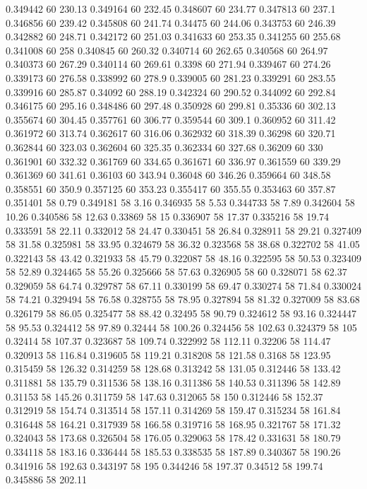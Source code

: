0.349442 60 230.13
0.349164 60 232.45
0.348607 60 234.77
0.347813 60 237.1
0.346856 60 239.42
0.345808 60 241.74
0.34475 60 244.06
0.343753 60 246.39
0.342882 60 248.71
0.342172 60 251.03
0.341633 60 253.35
0.341255 60 255.68
0.341008 60 258
0.340845 60 260.32
0.340714 60 262.65
0.340568 60 264.97
0.340373 60 267.29
0.340114 60 269.61
0.3398 60 271.94
0.339467 60 274.26
0.339173 60 276.58
0.338992 60 278.9
0.339005 60 281.23
0.339291 60 283.55
0.339916 60 285.87
0.34092 60 288.19
0.342324 60 290.52
0.344092 60 292.84
0.346175 60 295.16
0.348486 60 297.48
0.350928 60 299.81
0.35336 60 302.13
0.355674 60 304.45
0.357761 60 306.77
0.359544 60 309.1
0.360952 60 311.42
0.361972 60 313.74
0.362617 60 316.06
0.362932 60 318.39
0.36298 60 320.71
0.362844 60 323.03
0.362604 60 325.35
0.362334 60 327.68
0.36209 60 330
0.361901 60 332.32
0.361769 60 334.65
0.361671 60 336.97
0.361559 60 339.29
0.361369 60 341.61
0.36103 60 343.94
0.36048 60 346.26
0.359664 60 348.58
0.358551 60 350.9
0.357125 60 353.23
0.355417 60 355.55
0.353463 60 357.87
0.351401 58 0.79
0.349181 58 3.16
0.346935 58 5.53
0.344733 58 7.89
0.342604 58 10.26
0.340586 58 12.63
0.33869 58 15
0.336907 58 17.37
0.335216 58 19.74
0.333591 58 22.11
0.332012 58 24.47
0.330451 58 26.84
0.328911 58 29.21
0.327409 58 31.58
0.325981 58 33.95
0.324679 58 36.32
0.323568 58 38.68
0.322702 58 41.05
0.322143 58 43.42
0.321933 58 45.79
0.322087 58 48.16
0.322595 58 50.53
0.323409 58 52.89
0.324465 58 55.26
0.325666 58 57.63
0.326905 58 60
0.328071 58 62.37
0.329059 58 64.74
0.329787 58 67.11
0.330199 58 69.47
0.330274 58 71.84
0.330024 58 74.21
0.329494 58 76.58
0.328755 58 78.95
0.327894 58 81.32
0.327009 58 83.68
0.326179 58 86.05
0.325477 58 88.42
0.32495 58 90.79
0.324612 58 93.16
0.324447 58 95.53
0.324412 58 97.89
0.32444 58 100.26
0.324456 58 102.63
0.324379 58 105
0.32414 58 107.37
0.323687 58 109.74
0.322992 58 112.11
0.32206 58 114.47
0.320913 58 116.84
0.319605 58 119.21
0.318208 58 121.58
0.3168 58 123.95
0.315459 58 126.32
0.314259 58 128.68
0.313242 58 131.05
0.312446 58 133.42
0.311881 58 135.79
0.311536 58 138.16
0.311386 58 140.53
0.311396 58 142.89
0.31153 58 145.26
0.311759 58 147.63
0.312065 58 150
0.312446 58 152.37
0.312919 58 154.74
0.313514 58 157.11
0.314269 58 159.47
0.315234 58 161.84
0.316448 58 164.21
0.317939 58 166.58
0.319716 58 168.95
0.321767 58 171.32
0.324043 58 173.68
0.326504 58 176.05
0.329063 58 178.42
0.331631 58 180.79
0.334118 58 183.16
0.336444 58 185.53
0.338535 58 187.89
0.340367 58 190.26
0.341916 58 192.63
0.343197 58 195
0.344246 58 197.37
0.34512 58 199.74
0.345886 58 202.11

